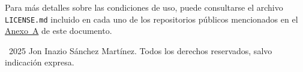 Para más detalles sobre las condiciones de uso, puede consultarse el archivo \texttt{LICENSE.md} incluido en cada uno de los repositorios públicos mencionados en el \hyperref[anexo:repositorios]{Anexo~A} de este documento.

\noindent\textcopyright~2025 Jon Inazio Sánchez Martínez. Todos los derechos reservados, salvo indicación expresa.